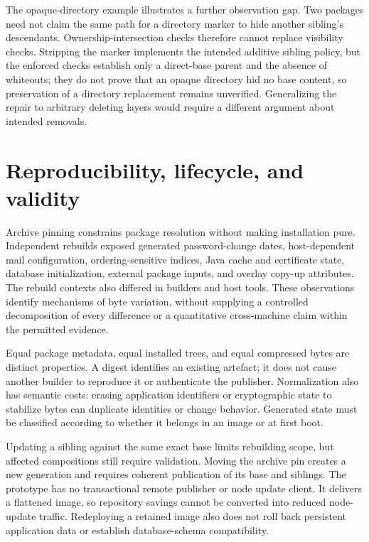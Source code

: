 The opaque-directory example illustrates a further observation gap. Two packages need not claim the same path for a directory marker to hide another sibling's descendants. Ownership-intersection checks therefore cannot replace visibility checks. Stripping the marker implements the intended additive sibling policy, but the enforced checks establish only a direct-base parent and the absence of whiteouts; they do not prove that an opaque directory hid no base content, so preservation of a directory replacement remains unverified. Generalizing the repair to arbitrary deleting layers would require a different argument about intended removals.

\section{Reproducibility, lifecycle, and validity}

Archive pinning constrains package resolution without making installation pure. Independent rebuilds exposed generated password-change dates, host-dependent mail configuration, ordering-sensitive indices, Java cache and certificate state, database initialization, external package inputs, and overlay copy-up attributes. The rebuild contexts also differed in builders and host tools. These observations identify mechanisms of byte variation, without supplying a controlled decomposition of every difference or a quantitative cross-machine claim within the permitted evidence.

Equal package metadata, equal installed trees, and equal compressed bytes are distinct properties. A digest identifies an existing artefact; it does not cause another builder to reproduce it or authenticate the publisher. Normalization also has semantic costs: erasing application identifiers or cryptographic state to stabilize bytes can duplicate identities or change behavior. Generated state must be classified according to whether it belongs in an image or at first boot.

Updating a sibling against the same exact base limits rebuilding scope, but affected compositions still require validation. Moving the archive pin creates a new generation and requires coherent publication of its base and siblings. The prototype has no transactional remote publisher or node update client. It delivers a flattened image, so repository savings cannot be converted into reduced node-update traffic. Redeploying a retained image also does not roll back persistent application data or establish database-schema compatibility.

